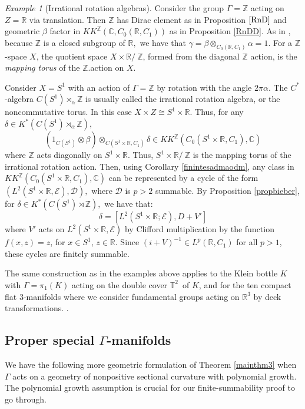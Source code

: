 \documentclass[a4paper,reqno]{amsart}
\numberwithin{equation}{section}
\def\C{\mathbb{C}}
\def\R{\mathbb{R}}
\def\Z{\mathbb{Z}}
\theoremstyle{definition}
\theoremstyle{remark}
\newtheorem{example}[thm]{Example}
\begin{document}
\begin{example}[Irrational rotation algebras]
Consider the group $\Gamma = \Z$ acting on $Z = \R$ via translation. Then $\Z$ has Dirac element as in Proposition $\ref{RnD}$ and geometric $\beta$ factor in $KK^\Z(\C,C_0(\R,C_1))$ as in Proposition \ref{RnDD}. As in \cite{Ech}, because $\Z$ is a closed subgroup of $\R,$ we have that $\gamma =\beta \otimes_{C_0(\R,C_1)} \alpha =1$. For a $\Z$-space $X$, the quotient space $X \times \R/ \: \Z$, formed from the diagonal $\Z$ action, is the \textit{mapping torus} of the $\Z$.action on $X$.
 
Consider $X = S^1$ with an action of $\Gamma = \Z$ by rotation with the angle $2\pi \alpha$. The $C^*$-algebra $C(S^1) \rtimes_\alpha \Z$ is usually called the irrational rotation algebra, or the noncommutative torus. In this case $X \times Z \cong S^1 \times \R.$ Thus, for any $\delta \in K^*(C(S^1) \rtimes_\alpha \Z),$ \[(1_{C(S^1)} \otimes \beta) \otimes_{C(S^1 \times \R, C_1)} \delta\in KK^\Z(C_0(S^1 \times \R, C_1),\C)\] where $\Z$ acts diagonally on $S^1 \times \R.$ Thus, $S^1 \times \R/ \: \Z$ is the mapping torus of the irrational rotation action. Then, using Corollary \ref{finintesadmaodm}, any class in $KK^\Z(C_0(S^1 \times \R, C_1), \C)$ can be represented by a cycle of the form $(L^2(S^1 \times \R, \mathcal{E}), \mathcal{D}),$ where $\mathcal{D}$ is $p > 2$ summable. By Proposition \ref{propbieber}, for $\delta\in K^*(C(S^1) \rtimes \Z),$ we have that: 
   \[\delta =[L^2(S^1 \times \R; \mathcal{E}), D + V']\]
 where $V'$ acts on $L^2(S^1 \times \R, \mathcal{E})$ by Clifford multiplication by the function $f(x,z) = z$, for $x \in S^1$, $z \in \R$. Since $(i +V)^{-1} \in L^p(\R,C_1)$ for all $p >1$,  these cycles are finitely summable. 
\end{example}


The same construction as in the examples above applies to the Klein bottle $K$ with $\Gamma=\pi_1(K)$ acting on the double cover $\mathbb{T}^2$ of $K$, and for the ten compact flat $3$-manifolds \cite{Wolf} where we consider fundamental groups acting on $\mathbb{R}^3$ by deck transformations. .



\subsection{Proper special $\Gamma$-manifolds}

We have the following more geometric formulation of Theorem \ref{mainthm3} when $\Gamma$ acts on a geometry of nonpositive sectional curvature with polynomial growth. The polynomial growth assumption is crucial for our finite-summability proof to go through.
\end{document}
